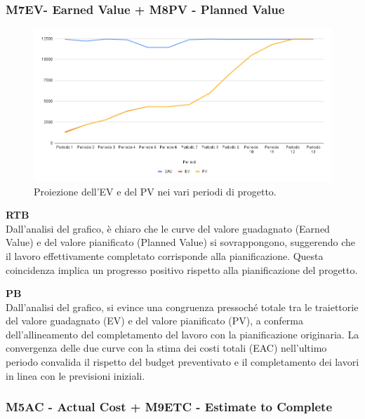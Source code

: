 \subsubsection{M7EV- Earned Value + M8PV - Planned Value} 

\vspace{0.3cm}

\begin{figure}[H]
    \centering
    \includegraphics[width=1\textwidth]{../Images/PianoDiQualifica/EV_PV.png}
    \caption{Proiezione dell’EV e del PV nei vari periodi di progetto.}
    \label{fig:3}
\end{figure}

\vspace{0.2cm}

\textbf{RTB} \\
Dall'analisi del grafico, è chiaro che le curve del valore guadagnato (Earned Value) e del valore pianificato (Planned Value) si sovrappongono, suggerendo che il lavoro effettivamente completato corrisponde alla pianificazione. 
Questa coincidenza implica un progresso positivo rispetto alla pianificazione del progetto.

\vspace{0.3cm}

\textbf{PB} \\ 
Dall'analisi del grafico, si evince una congruenza pressoché totale tra le traiettorie del valore guadagnato (EV) e del valore pianificato (PV), a conferma dell'allineamento del completamento del lavoro con la pianificazione originaria.
La convergenza delle due curve con la stima dei costi totali (EAC) nell'ultimo periodo convalida il rispetto del budget preventivato e il completamento dei lavori in linea con le previsioni iniziali.

\subsubsection{M5AC - Actual Cost + M9ETC - Estimate to Complete}

